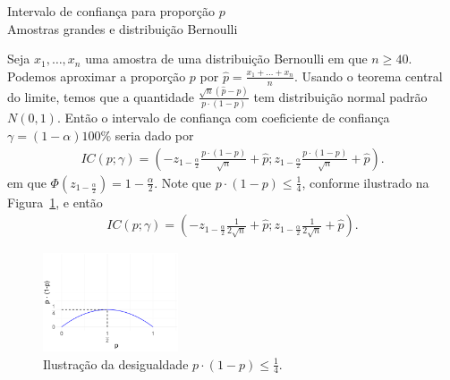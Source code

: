 \documentclass[8pt]{beamer}
\begin{document}
\begin{frame}{Intervalo de confiança para proporção $p$\\ Amostras grandes e distribuição Bernoulli}

\small

	Seja $x_1, \dots, x_n$ uma amostra de uma distribuição Bernoulli em que $n \geq 40$. Podemos aproximar a proporção $p$ por $\hat{p}=\frac{x_1 + \dots + x_n}{n}$. Usando o teorema central do limite, temos que a quantidade $\frac{\sqrt{n}(\hat{p} - p)}{p \cdot (1 - p)} $ tem distribuição normal padrão $ N(0, 1)$. Então o intervalo de confiança com coeficiente de confiança $\gamma=(1-\alpha)100\%$ seria dado por
	\begin{align*}
		IC(p; \gamma) = \left( -z_{1-\frac{\alpha}{2}} \frac{p\cdot (1-p)}{\sqrt{n}} + \hat{p}; z_{1-\frac{\alpha}{2}} \frac{p\cdot (1-p)}{\sqrt{n}} + \hat{p} \right).
	\end{align*}
	em que $\Phi(z_{1-\frac{\alpha}{2}}) = 1- \frac{\alpha}{2}$.
	Note que $p \cdot (1 - p) \leq \frac{1}{4}$, conforme ilustrado na Figura~\ref{fig:proportion}, e então
	\begin{align*}
	IC(p; \gamma) = \left( -z_{1-\frac{\alpha}{2}} \frac{1}{2\sqrt{n}} + \hat{p}; z_{1-\frac{\alpha}{2}} \frac{1}{2\sqrt{n}} + \hat{p} \right).
	\end{align*}
	
	\begin{figure}[htbp]
		\centering
		\caption{Ilustração da desigualdade $p \cdot (1-p) \leq \frac{1}{4}$. }
		\label{fig:proportion}
		\includegraphics[width=4cm]{proportion.png}
	\end{figure}

\normalsize 

\end{frame}
\end{document}
